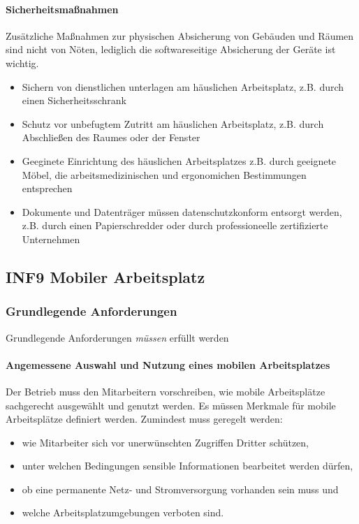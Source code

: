 \documentclass[a4paper, 12pt]{report}
\begin{document}
\begin{multicols}{2}
\paragraph{Sicherheitsmaßnahmen}
Zusätzliche Maßnahmen zur physischen Absicherung von Gebäuden und Räumen sind 
nicht von Nöten, lediglich die softwareseitige Absicherung der Geräte ist 
wichtig. 

\begin{itemize}
	\item Sichern von dienstlichen unterlagen am häuslichen Arbeitsplatz, 
		z.B. durch einen Sicherheitsschrank
	\item Schutz vor unbefugtem Zutritt am häuslichen Arbeitsplatz, z.B. 
		durch Abschließen des Raumes oder der Fenster
	\item Geeginete Einrichtung des häuslichen Arbeitsplatzes z.B. durch 
		geeignete Möbel, die arbeitsmedizinischen und ergonomichen 
		Bestimmungen entsprechen
	\item Dokumente und Datenträger müssen datenschutzkonform entsorgt 
		werden, z.B. durch einen Papierschredder oder durch 
		professioneelle zertifizierte Unternehmen
\end{itemize}

\subsection{INF9 Mobiler Arbeitsplatz}

\subsubsection{Grundlegende Anforderungen}

 Grundlegende Anforderungen \emph{müssen} erfüllt werden
 
\paragraph{Angemessene Auswahl und Nutzung eines mobilen Arbeitsplatzes}
 
Der Betrieb muss den Mitarbeitern vorschreiben, wie mobile Arbeitsplätze 
sachgerecht ausgewählt und genutzt werden. Es müssen Merkmale für mobile 
Arbeitsplätze definiert werden. Zumindest muss geregelt werden:
\begin{itemize}
	\item wie Mitarbeiter sich vor unerwünschten Zugriffen 
		Dritter schützen, 
	\item unter welchen Bedingungen sensible Informationen 
		bearbeitet werden dürfen,
	\item ob eine permanente Netz- und Stromversorgung 
		vorhanden sein muss und
	\item welche Arbeitsplatzumgebungen verboten sind.
\end{itemize}


\end{multicols}
\end{document}
